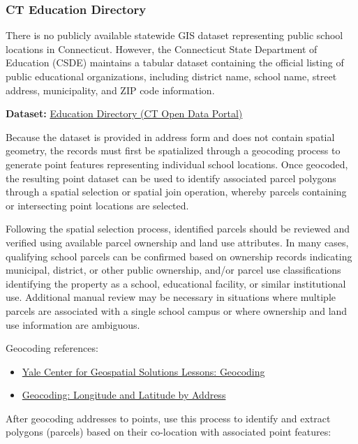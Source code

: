 \documentclass[
  letterpaper,
  DIV=11,
  numbers=noendperiod]{scrreprt}
\providecommand{\tightlist}{%
  \setlength{\itemsep}{0pt}\setlength{\parskip}{0pt}}
\begin{document}
\subsubsection{CT Education Directory}\label{sec-ct-education-directory}

There is no publicly available statewide GIS dataset representing public
school locations in Connecticut. However, the Connecticut State
Department of Education (CSDE) maintains a tabular dataset containing
the official listing of public educational organizations, including
district name, school name, street address, municipality, and ZIP code
information.

\textbf{Dataset:}
\href{https://data.ct.gov/Education/Education-Directory/9k2y-kqxn/about_data}{Education
Directory (CT Open Data Portal)}

Because the dataset is provided in address form and does not contain
spatial geometry, the records must first be spatialized through a
geocoding process to generate point features representing individual
school locations. Once geocoded, the resulting point dataset can be used
to identify associated parcel polygons through a spatial selection or
spatial join operation, whereby parcels containing or intersecting point
locations are selected.

Following the spatial selection process, identified parcels should be
reviewed and verified using available parcel ownership and land use
attributes. In many cases, qualifying school parcels can be confirmed
based on ownership records indicating municipal, district, or other
public ownership, and/or parcel use classifications identifying the
property as a school, educational facility, or similar institutional
use. Additional manual review may be necessary in situations where
multiple parcels are associated with a single school campus or where
ownership and land use information are ambiguous.

Geocoding references:

\begin{itemize}
\tightlist
\item
  \href{https://geospatial.yale.edu/tutorials-geocoding}{Yale Center for
  Geospatial Solutions Lessons: Geocoding}
\item
  \href{https://gisgeography.com/geocoding/}{Geocoding: Longitude and
  Latitude by Address}
\end{itemize}

After geocoding addresses to points, use this process to identify and
extract polygons (parcels) based on their co-location with associated
point features:
\end{document}
